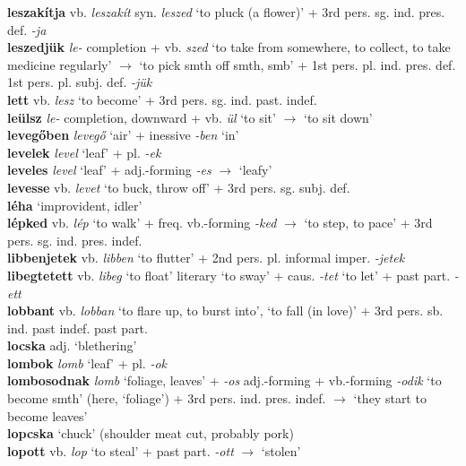 \documentclass[11pt]{article}
\begin{document}
\textbf{leszakítja} vb. \emph{leszakít} syn. \emph{leszed} `to pluck (a flower)' + 3rd
pers. sg. ind. pres. def. \emph{-ja}  \\
\textbf{leszedjük} \emph{le-} completion + vb. \emph{szed}
`to take from somewhere, to collect, to take medicine regularly'
$\rightarrow$ `to pick smth off smth, smb' + 1st
pers. pl. ind. pres. def. \textbar\textbar{} 1st
pers. pl. subj. def. \emph{-jük} \\
\textbf{lett} vb. \emph{lesz} `to become' + 3rd pers. sg. ind. past. indef. \\
\textbf{leülsz} \emph{le-} completion, downward + vb. \emph{ül}
`to sit' $\rightarrow$ `to sit down' \\
\textbf{levegőben} \emph{levegő} `air' + inessive \emph{-ben} `in' \\
\textbf{levelek} \emph{level} `leaf' + pl. \emph{-ek} \\
\textbf{leveles} \emph{level} `leaf' + adj.\hyp{}forming \emph{-es}
$\rightarrow$ `leafy' \\
\textbf{levesse} vb. \emph{levet} `to buck, throw off' + 3rd
pers. sg. subj. def. \\
\textbf{léha} `improvident, idler' \\
\textbf{lépked} vb. \emph{lép} `to walk' +
freq. vb.\hyp{}forming \emph{-ked} $\rightarrow$ `to step, to pace' +
3rd pers. sg. ind. pres. indef. \\
\textbf{libbenjetek} vb. \emph{libben} `to flutter' + 2nd
pers. pl. informal imper. \emph{-jetek} \\
\textbf{libegtetett} vb. \emph{libeg} `to float' \textbar\textbar{}
literary `to sway' + caus. \emph{-tet} `to let' + past
part. \emph{-ett} \\
\textbf{lobbant} vb. \emph{lobban} `to flare up, to burst into', `to
fall (in love)' + 3rd pers. sb. ind. past indef. \textbar\textbar{} past
part. \\
\textbf{locska} adj. `blethering' \\
\textbf{lombok} \emph{lomb} `leaf' + pl. \emph{-ok} \\
\textbf{lombosodnak} \emph{lomb} `foliage, leaves' + \emph{-os}
adj.\hyp{}forming + vb.-forming \emph{-odik} `to become smth' (here, `foliage') + 3rd
pers. ind. pres. indef. $\rightarrow$ `they start to become leaves' \\
\textbf{lopcska} `chuck' (shoulder meat cut, probably pork) \\
\textbf{lopott} vb. \emph{lop} `to steal' + past part. \emph{-ott}
$\rightarrow$ `stolen' \\
\end{document}
